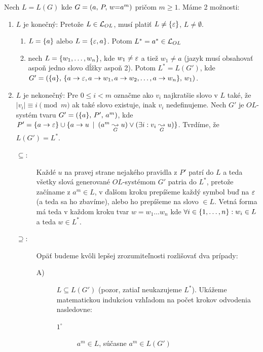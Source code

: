 \begin{dokaz}
  Nech $L = L(G)$ kde $G = (a,\,P,\,w \mbox{=} a^m)$ pričom $m \ge 1$.
  Máme 2 možnosti:
  \begin{enumerate}
    \item $L$ je konečný:
      Pretože $L \in \mathcal{L}_{OL}$, musí platiť
      $L \not= \{\varepsilon\}$, $L \not= \emptyset$.
      \begin{enumerate}
        \item $L = \{a\}$ alebo $L = \{\varepsilon,a\}$.
          Potom $L^{*} = a^{*} \in \mathcal{L}_{OL}$

        \item nech $L = \{w_1, \dots, w_n\}$,
          kde $w_1 \not= \varepsilon$ a tiež $w_1 \not= a$
          (jazyk musí obsahovať aspoň jedno slovo dĺžky aspoň 2).
          Potom $L^{*} = L(G')$, kde $G'=(\{a\},\, 
            \{a \rightarrow \varepsilon, a\rightarrow w_1, a \rightarrow w_2, \dots,
              a \rightarrow w_{n}\}
            ,\,w_1)$.
      \end{enumerate}

    \item $L$ je nekonečný:
      Pre $0 \le i < m$ označme ako $v_i$
      najkratšie slovo v $L$ také, že $|v_{i}| \equiv i \pmod{m}$ ak 
      také slovo existuje, inak $v_i$ nedefinujeme.
      Nech $G'$ je $OL$-systém tvaru $G'=(\{a\},\,P',\,a^m)$, kde
      $P'=\{a \rightarrow \varepsilon\} \cup
          \{a \rightarrow u \enspace |\enspace
                  (a^m \underset{G}{\leadsto} u) \lor
                  (\exists i: v_{i} \underset{G}{\leadsto} u)
              \}$.
      Tvrdíme, že $L(G')=L^{*}$.

      \begin{description}
        \item[$\subseteq$:] Každé $u$ na pravej strane nejakého
          pravidla z $P'$ patrí do
          $L$ a teda všetky slová generované $OL$-systémom $G'$ patria do
          $L^{*}$, pretože začíname z $a^{m}\in L$, v ďalšom kroku prepíšeme
          každý symbol buď na $\varepsilon$ (a teda sa ho zbavíme), alebo ho
          prepíšeme na slovo $\in L$. Vetná forma má teda v každom kroku
          tvar $w = w_1 \dots w_n$ kde
          $\forall i \in \{1,\dots,n\} : w_i \in L$ a teda $w \in L^{*}$.

        \item[$\supseteq$:] Opäť budeme kvôli lepšej zrozumiteľnosti
          rozlišovať dva prípady:
          \begin{description}
            \item[A)] $L\subseteq L(G')$ (pozor, zatiaľ neukazujeme $L^*$).
              Ukážeme matematickou indukciou vzhľadom na počet krokov
              odvodenia nasledovne:
              \begin{description}
              \item[$1^{\circ}$] $a^m \in L$, súčasne $a^m \in L(G')$


\end{description}
\end{description}
\end{description}
\end{enumerate}
\end{dokaz}
